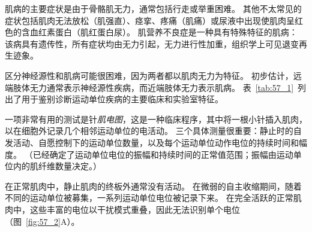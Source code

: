 肌病的主要症状是由于骨骼肌无力，通常包括行走或举重困难。
其他不太常见的症状包括肌肉无法放松（肌强直）、痉挛、疼痛（肌痛）或尿液中出现使肌肉呈红色的含血红素蛋白（肌红蛋白尿）。
肌营养不良症是一种具有特殊特征的肌病：
该病具有遗传性，所有症状均由无力引起，无力进行性加重，组织学上可见退变再生迹象。


区分神经源性和肌病可能很困难，因为两者都以肌肉无力为特征。
初步估计，远端肢体无力通常表示神经源性疾病，而近端肢体无力表示肌病。
表~\ref{tab:57_1}~列出了用于鉴别诊断运动单位疾病的主要临床和实验室特征。


一项非常有用的测试是针\textit{肌电图}，这是一种临床程序，其中将一根小针插入肌肉，以在细胞外记录几个相邻运动单位的电活动。
三个具体测量很重要：静止时的自发活动、自愿控制下的运动单位数量，以及每个运动单位动作电位的持续时间和幅度。
（已经确定了运动单位电位的振幅和持续时间的正常值范围；振幅由运动单位内的肌纤维数量决定。）


在正常肌肉中，静止肌肉的终板外通常没有活动。
在微弱的自主收缩期间，随着不同的运动单位被募集，一系列运动单位电位被记录下来。
在完全活跃的正常肌肉中，这些丰富的电位以干扰模式重叠，因此无法识别单个电位（图~\ref{fig:57_2}A）。


